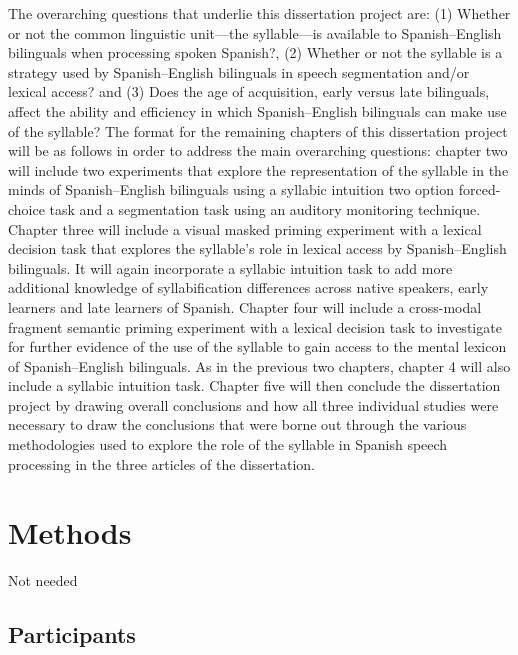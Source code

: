The overarching questions that underlie this dissertation project are: (1) Whether or not the common linguistic unit—the syllable—is available to Spanish–English bilinguals when processing spoken Spanish?, (2) Whether or not the syllable is a strategy used by Spanish–English bilinguals in speech segmentation and/or lexical access? and (3) Does the age of acquisition, early versus late bilinguals, affect the ability and efficiency in which Spanish–English bilinguals can make use of the syllable? The format for the remaining chapters of this dissertation project will be as follows in order to address the main overarching questions: chapter two will include two experiments that explore the representation of the syllable in the minds of Spanish–English bilinguals using a syllabic intuition two option forced-choice task and a segmentation task using an auditory monitoring technique. Chapter three will include a visual masked priming experiment with a lexical decision task that explores the syllable’s role in lexical access by Spanish–English bilinguals. It will again incorporate a syllabic intuition task to add more additional knowledge of syllabification differences across native speakers, early learners and late learners of Spanish. Chapter four will include a cross-modal fragment semantic priming experiment with a lexical decision task to investigate for further evidence of the use of the syllable to gain access to the mental lexicon of Spanish–English bilinguals. As in the previous two chapters, chapter 4 will also include a syllabic intuition task. Chapter five will then conclude the dissertation project by drawing overall conclusions and how all three individual studies were necessary to draw the conclusions that were borne out through the various methodologies used to explore the role of the syllable in Spanish speech processing in the three articles of the dissertation.



\section{Methods}

Not needed

\subsection{Participants}


